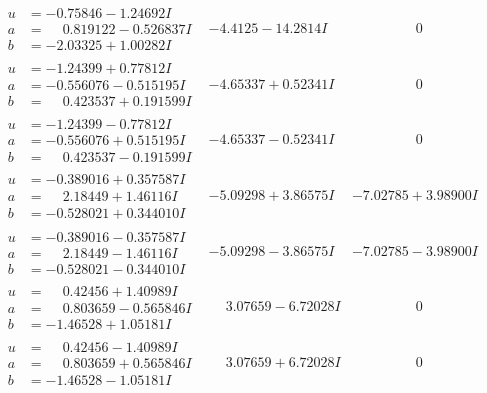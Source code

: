 \documentclass[1p]{elsarticle_modified}
\theoremstyle{definition}
\begin{document}
$$\begin{array}{c|c|c}
\begin{aligned}
u &= -0.75846 - 1.24692 I \\
a &= \phantom{-}0.819122 - 0.526837 I \\
b &= -2.03325 + 1.00282 I\end{aligned}
 & -4.4125 - 14.2814 I & \phantom{-0.000000 } 0 \\ \hline\begin{aligned}
u &= -1.24399 + 0.77812 I \\
a &= -0.556076 - 0.515195 I \\
b &= \phantom{-}0.423537 + 0.191599 I\end{aligned}
 & -4.65337 + 0.52341 I & \phantom{-0.000000 } 0 \\ \hline\begin{aligned}
u &= -1.24399 - 0.77812 I \\
a &= -0.556076 + 0.515195 I \\
b &= \phantom{-}0.423537 - 0.191599 I\end{aligned}
 & -4.65337 - 0.52341 I & \phantom{-0.000000 } 0 \\ \hline\begin{aligned}
u &= -0.389016 + 0.357587 I \\
a &= \phantom{-}2.18449 + 1.46116 I \\
b &= -0.528021 + 0.344010 I\end{aligned}
 & -5.09298 + 3.86575 I & -7.02785 + 3.98900 I \\ \hline\begin{aligned}
u &= -0.389016 - 0.357587 I \\
a &= \phantom{-}2.18449 - 1.46116 I \\
b &= -0.528021 - 0.344010 I\end{aligned}
 & -5.09298 - 3.86575 I & -7.02785 - 3.98900 I \\ \hline\begin{aligned}
u &= \phantom{-}0.42456 + 1.40989 I \\
a &= \phantom{-}0.803659 - 0.565846 I \\
b &= -1.46528 + 1.05181 I\end{aligned}
 & \phantom{-}3.07659 - 6.72028 I & \phantom{-0.000000 } 0 \\ \hline\begin{aligned}
u &= \phantom{-}0.42456 - 1.40989 I \\
a &= \phantom{-}0.803659 + 0.565846 I \\
b &= -1.46528 - 1.05181 I\end{aligned}
 & \phantom{-}3.07659 + 6.72028 I & \phantom{-0.000000 } 0 \\ \hline\begin{aligned}

\end{aligned}
\end{array}$$
\end{document}
